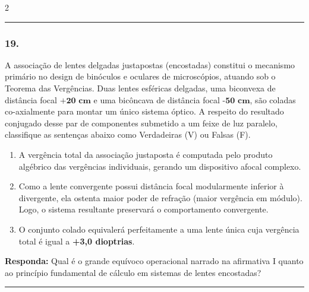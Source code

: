 \documentclass[twoside, 10pt, a4paper]{article}
\newlength{\espacoPreQuestao}\setlength{\espacoPreQuestao}{0.1cm}
\newlength{\espacoQuestao}\setlength{\espacoQuestao}{0.2cm}
\newlength{\espacoAlt}\setlength{\espacoAlt}{0.2cm}
\begin{document}
\begin{multicols*}{2}
\noindent\textcolor{CorLinha}{\rule{\linewidth}{0.5pt}} 
\par\vspace{\espacoPreQuestao}
\subsubsection*{19.} A associação de lentes delgadas justapostas (encostadas) constitui o mecanismo primário no design de binóculos e oculares de microscópios, atuando sob o Teorema das Vergências. Duas lentes esféricas delgadas, uma biconvexa de distância focal $ \textbf{+20 cm} $ e uma bicôncava de distância focal $ \textbf{-50 cm} $, são coladas co-axialmente para montar um único sistema óptico.
A respeito do resultado conjugado desse par de componentes submetido a um feixe de luz paralelo, classifique as sentenças abaixo como Verdadeiras (V) ou Falsas (F).
\begin{enumerate}[label=\Roman*., itemsep=\espacoAlt]
\item A vergência total da associação justaposta é computada pelo produto algébrico das vergências individuais, gerando um dispositivo afocal complexo.
\item Como a lente convergente possui distância focal modularmente inferior à divergente, ela ostenta maior poder de refração (maior vergência em módulo). Logo, o sistema resultante preservará o comportamento convergente.
\item O conjunto colado equivalerá perfeitamente a uma lente única cuja vergência total é igual a \textbf{+3,0 dioptrias}.
\end{enumerate}
\begin{boxresponda}
\textbf{Responda:} Qual é o grande equívoco operacional narrado na afirmativa I quanto ao princípio fundamental de cálculo em sistemas de lentes encostadas?
\end{boxresponda}
\par\vspace{\espacoQuestao}

\noindent\textcolor{CorLinha}{\rule{\linewidth}{0.5pt}} 
\par\vspace{\espacoPreQuestao}

\end{multicols*}
\end{document}
